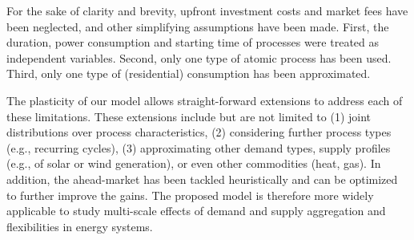 \documentclass[conference]{IEEEtran}
\begin{document}
For the sake of clarity and brevity, upfront investment costs and market fees have been neglected, and other simplifying assumptions have been made. First, the duration, power consumption and starting time of processes were treated as independent variables. Second, only one type of atomic process has been used. Third, only one type of (residential) consumption has been approximated. 

The plasticity of our model allows straight-forward extensions to address each of these limitations. These extensions include but are not limited to (1) joint distributions over process characteristics, (2) considering further process types (e.g., recurring cycles), (3) approximating other demand types, supply profiles (e.g., of solar or wind generation), or even other commodities (heat, gas). In addition, the ahead-market has been tackled heuristically and can be optimized to further improve the gains. %
The proposed model is therefore more widely applicable to study multi-scale effects of demand and supply aggregation and flexibilities in energy systems.



\balance

\end{document}
